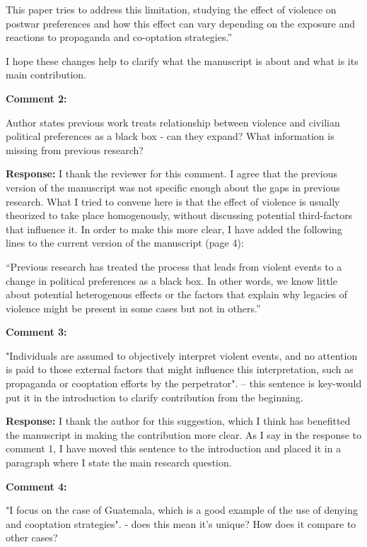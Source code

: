 \documentclass[12pt, a4paper, notitlepage]{article}
\begin{document}
This paper tries to address this limitation, studying the effect of violence on postwar preferences and how this effect can vary depending on the exposure and reactions to propaganda and co-optation strategies.''

I hope these changes help to clarify what the manuscript is about and what is its main contribution.

\vspace{15pt}
\noindent\textbf{Comment 2:}
\begin{displayquote}
Author states previous work treats relationship between violence and civilian political preferences as a black box - can they expand? What information is missing from previous research?
\end{displayquote}

\noindent\textbf{Response:} I thank the reviewer for this comment. I agree that the previous version of the manuscript was not specific enough about the gaps in previous research. What I tried to convene here is that the effect of violence is usually theorized to take place homogenously, without discussing potential third-factors that influence it. In order to make this more clear, I have added the following lines to the current version of the manuscript (page 4):

``Previous research has treated the process that leads from violent events to a change in political preferences as a black box.
In other words, we know little about potential heterogenous effects or the factors that explain why legacies of violence might be present in some cases but not in others.''


\vspace{15pt}
\noindent\textbf{Comment 3:}
\begin{displayquote}
"Individuals are assumed to objectively interpret violent events, and no attention is paid to those external factors that might influence this interpretation, such as propaganda or cooptation efforts by the perpetrator". -- this sentence is key-would put it in the introduction to clarify contribution from the beginning.
\end{displayquote}

\noindent\textbf{Response:} I thank the author for this suggestion, which I think has benefitted the manuscript in making the contribution more clear. As I say in the response to comment 1, I have moved this sentence to the introduction and placed it in a paragraph where I state the main research question.

\vspace{15pt}
\noindent\textbf{Comment 4:}
\begin{displayquote}
"I focus on the case of Guatemala, which is a good example of the use of denying and cooptation strategies". - does this mean it's unique? How does it compare to other cases?
\end{displayquote}
\end{document}
